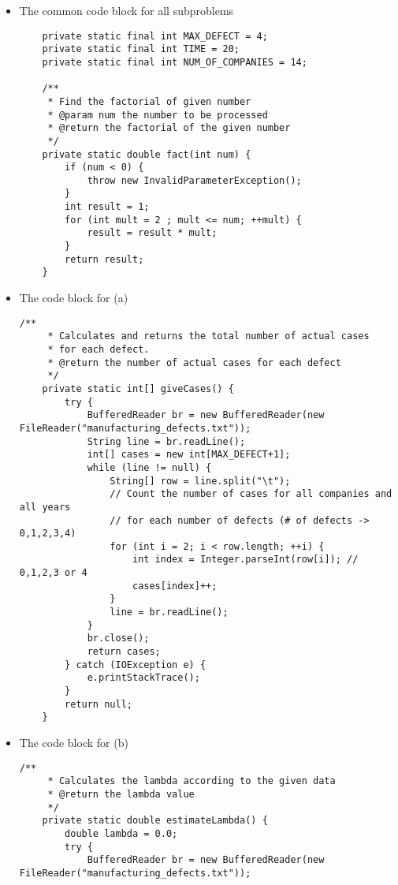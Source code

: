 \documentclass[a4 paper]{article}
\numberwithin{equation}{section}
\newcommand{\0}{\mathbf{0}}
\begin{document}
	\begin{itemize}
		\item The common code block for all subproblems\\
		\begin{lstlisting}
    private static final int MAX_DEFECT = 4;
    private static final int TIME = 20;
    private static final int NUM_OF_COMPANIES = 14;

    /**
     * Find the factorial of given number
     * @param num the number to be processed
     * @return the factorial of the given number
     */
    private static double fact(int num) {
        if (num < 0) {
            throw new InvalidParameterException();
        }
        int result = 1;
        for (int mult = 2 ; mult <= num; ++mult) {
            result = result * mult;
        }
        return result;
    }
		\end{lstlisting}
		\item The code block for (a)\\
		\begin{lstlisting}
/**
     * Calculates and returns the total number of actual cases
     * for each defect.
     * @return the number of actual cases for each defect
     */
    private static int[] giveCases() {
        try {
            BufferedReader br = new BufferedReader(new FileReader("manufacturing_defects.txt"));
            String line = br.readLine();
            int[] cases = new int[MAX_DEFECT+1];
            while (line != null) {
                String[] row = line.split("\t");
                // Count the number of cases for all companies and all years
                // for each number of defects (# of defects -> 0,1,2,3,4)
                for (int i = 2; i < row.length; ++i) {
                    int index = Integer.parseInt(row[i]); // 0,1,2,3 or 4
                    cases[index]++;
                }
                line = br.readLine();
            }
            br.close();
            return cases;
        } catch (IOException e) {
            e.printStackTrace();
        }
        return null;
    }
		\end{lstlisting}
		\item The code block for (b)\\
		\begin{lstlisting}
/**
     * Calculates the lambda according to the given data
     * @return the lambda value
     */
    private static double estimateLambda() {
        double lambda = 0.0;
        try {
            BufferedReader br = new BufferedReader(new FileReader("manufacturing_defects.txt"));

\end{lstlisting}
\end{itemize}
\end{document}
